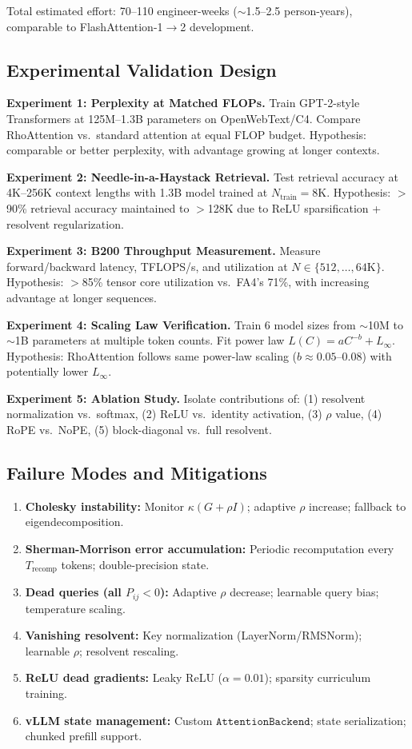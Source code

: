 \documentclass[11pt,a4paper]{article}
\theoremstyle{remark}
\begin{document}
Total estimated effort: 70--110 engineer-weeks ($\sim$1.5--2.5 person-years), comparable to FlashAttention-1$\to$2 development.

\subsection{Experimental Validation Design}

\textbf{Experiment 1: Perplexity at Matched FLOPs.} Train GPT-2-style Transformers at 125M--1.3B parameters on OpenWebText/C4. Compare RhoAttention vs.\ standard attention at equal FLOP budget. Hypothesis: comparable or better perplexity, with advantage growing at longer contexts.

\textbf{Experiment 2: Needle-in-a-Haystack Retrieval.} Test retrieval accuracy at 4K--256K context lengths with 1.3B model trained at $N_{\text{train}} = 8\text{K}$. Hypothesis: $>$90\% retrieval accuracy maintained to $>$128K due to ReLU sparsification + resolvent regularization.

\textbf{Experiment 3: B200 Throughput Measurement.} Measure forward/backward latency, TFLOPS/s, and utilization at $N \in \{512, \ldots, 64\text{K}\}$. Hypothesis: $>$85\% tensor core utilization vs.\ FA4's 71\%, with increasing advantage at longer sequences.

\textbf{Experiment 4: Scaling Law Verification.} Train 6 model sizes from $\sim$10M to $\sim$1B parameters at multiple token counts. Fit power law $L(C) = a C^{-b} + L_\infty$. Hypothesis: RhoAttention follows same power-law scaling ($b \approx 0.05$--$0.08$) with potentially lower $L_\infty$.

\textbf{Experiment 5: Ablation Study.} Isolate contributions of: (1) resolvent normalization vs.\ softmax, (2) ReLU vs.\ identity activation, (3) $\rho$ value, (4) RoPE vs.\ NoPE, (5) block-diagonal vs.\ full resolvent.

\subsection{Failure Modes and Mitigations}

\begin{enumerate}[leftmargin=*]
    \item \textbf{Cholesky instability:} Monitor $\kappa(G + \rho I)$; adaptive $\rho$ increase; fallback to eigendecomposition.
    \item \textbf{Sherman-Morrison error accumulation:} Periodic recomputation every $T_{\text{recomp}}$ tokens; double-precision state.
    \item \textbf{Dead queries (all $P_{ij} < 0$):} Adaptive $\rho$ decrease; learnable query bias; temperature scaling.
    \item \textbf{Vanishing resolvent:} Key normalization (LayerNorm/RMSNorm); learnable $\rho$; resolvent rescaling.
    \item \textbf{ReLU dead gradients:} Leaky ReLU ($\alpha = 0.01$); sparsity curriculum training.
    \item \textbf{vLLM state management:} Custom $\texttt{AttentionBackend}$; state serialization; chunked prefill support.
\end{enumerate}
\end{document}
